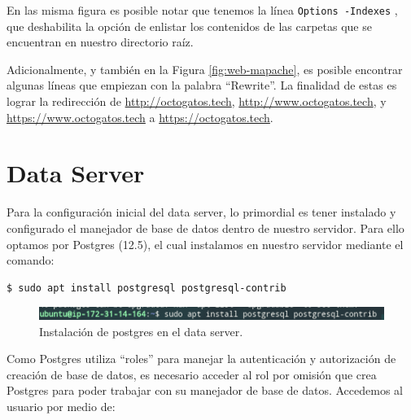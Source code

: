 \documentclass{article}
\newcommand{\ttt}[1]{%
\texttt{#1}%
}
\begin{document}
En las misma figura es posible notar que tenemos
la l\'inea \ttt{Options -Indexes}, que deshabilita
la opci\'on de enlistar los contenidos de las carpetas
que se encuentran en nuestro directorio ra\'iz.

Adicionalmente, y tambi\'en en la Figura \ref{fig:web-mapache},
es posible encontrar algunas l\'ineas que empiezan con
la palabra ``Rewrite''.   La finalidad de estas es lograr
la redirecci\'on de
\href{http://octogatos.tech}{http://octogatos.tech},
\href{http://www.octogatos.tech}{http://www.octogatos.tech}, y
\href{https://www.octogatos.tech}{https://www.octogatos.tech}
a \href{https://octogatos.tech}{https://octogatos.tech}.






\section{Data Server}

Para la configuración inicial del data server, lo primordial
es tener instalado y configurado el manejador de base de datos
dentro de nuestro servidor. Para ello optamos por Postgres
(12.5), el cual instalamos en nuestro servidor mediante el
comando:

\begin{lstlisting}
$ sudo apt install postgresql postgresql-contrib
\end{lstlisting}

\begin{figure}[H]
  \centering
  \includegraphics[width=\textwidth]{DATASERVER/exhibitA}
  \caption{Instalación de postgres en el data server.}
  \label{fig:DATASERVER-A}
\end{figure}

Como Postgres utiliza ``roles'' para manejar la autenticación y
autorización de creación de base de datos, es necesario acceder
al rol por omisión que crea Postgres para poder trabajar con su
manejador de base de datos. Accedemos al usuario por medio de:
\end{document}
